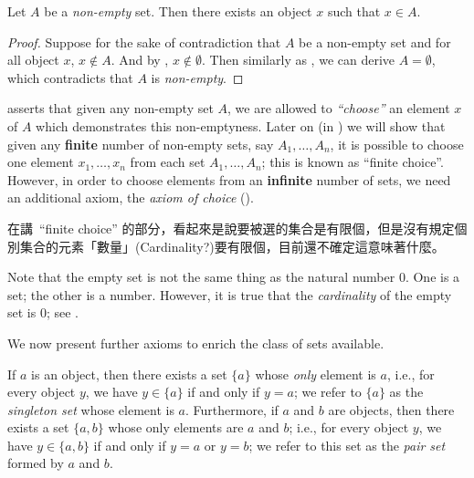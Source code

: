 \begin{lemma}\label{lem 3.1.6}
Let \(A\) be a \emph{non-empty} set. Then there exists an object \(x\) such that \(x \in A\).
\end{lemma}
\begin{proof}
Suppose for the sake of contradiction that \(A\) be a non-empty set and for all object \(x\), \(x \notin A\). And by , \(x \notin \emptyset\). Then similarly as , we can derive \(A = \emptyset\), which contradicts that \(A\) is \emph{non-empty}.
\end{proof}

\begin{remark}\label{remark 3.1.7}
 asserts that given any non-empty set \(A\), we are allowed to \emph{``choose''} an element \(x\) of \(A\) which demonstrates this non-emptyness. 
Later on (in ) we will show that given any \textbf{finite} number of non-empty sets, say \(A_1, \dots, A_n\), it is possible to choose one element \(x_1, \dots, x_n\) from each set \(A_1, \dots, A_n\); this is known as ``finite choice''. 
However, in order to choose elements from an \textbf{infinite} number of sets, we need an additional axiom, the \emph{axiom of choice} ().
\end{remark}

\begin{note}
 在講\ ``finite choice'' 的部分，看起來是說要被選的集合是有限個，但是沒有規定個別集合的元素「數量」(Cardinality?)要有限個，目前還不確定這意味著什麼。
\end{note}

\begin{remark} \label{remark 3.1.8}
Note that the empty set is not the same thing as the natural number \(0\). One is a set; the other is a number. However, it is true that the \emph{cardinality} of the empty set is \(0\); see .
\end{remark}

We now present further axioms to enrich the class of sets available.

\begin{axiom}\label{axm 3.3}
If \(a\) is an object, then there exists a set \( \{a\} \) whose \emph{only} element is \(a\), i.e., for every object \(y\), we have \(y \in \{a\}\) if and only if \(y = a\); we refer to \( \{a\} \) as the \emph{singleton set} whose element is \(a\). 
Furthermore, if \(a\) and \(b\) are objects, then there exists a set \( \{a, b\} \) whose only elements are \(a\) and \(b\); i.e., for every object \(y\), we have \( y \in \{a, b\} \) if and only if \(y = a\) or \(y = b\); we refer to this set as the \emph{pair set} formed by \(a\) and \(b\).
\end{axiom}

